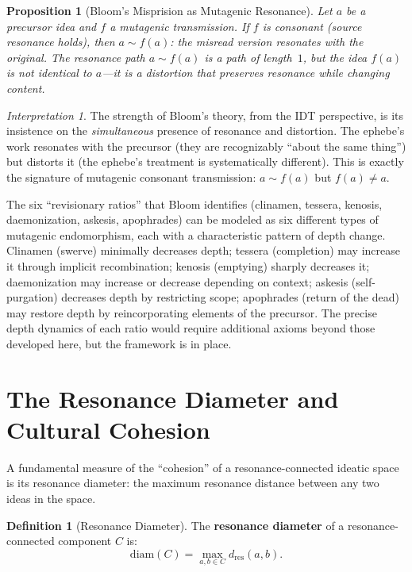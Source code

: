 \documentclass[11pt,openany]{book}
\theoremstyle{definition}
\newtheorem{definition}[axiom]{Definition}
\theoremstyle{plain}
\newtheorem{proposition}[axiom]{Proposition}
\theoremstyle{remark}
\newtheorem{interpretation}[axiom]{Interpretation}
\newcommand{\res}{\sim}                      %
\begin{document}
\begin{proposition}[Bloom's Misprision as Mutagenic Resonance]
Let $a$ be a precursor idea and $f$ a mutagenic transmission. If $f$ is consonant (source resonance holds), then $a \res f(a)$: the misread version resonates with the original. The resonance path $a \res f(a)$ is a path of length~$1$, but the idea $f(a)$ is not identical to $a$---it is a distortion that preserves resonance while changing content.
\end{proposition}

\begin{interpretation}
The strength of Bloom's theory, from the IDT perspective, is its insistence on the \emph{simultaneous} presence of resonance and distortion. The ephebe's work resonates with the precursor (they are recognizably ``about the same thing'') but distorts it (the ephebe's treatment is systematically different). This is exactly the signature of mutagenic consonant transmission: $a \res f(a)$ but $f(a) \neq a$.

The six ``revisionary ratios'' that Bloom identifies (clinamen, tessera, kenosis, daemonization, askesis, apophrades) can be modeled as six different types of mutagenic endomorphism, each with a characteristic pattern of depth change. Clinamen (swerve) minimally decreases depth; tessera (completion) may increase it through implicit recombination; kenosis (emptying) sharply decreases it; daemonization may increase or decrease depending on context; askesis (self-purgation) decreases depth by restricting scope; apophrades (return of the dead) may restore depth by reincorporating elements of the precursor. The precise depth dynamics of each ratio would require additional axioms beyond those developed here, but the framework is in place.
\end{interpretation}

\section{The Resonance Diameter and Cultural Cohesion}

A fundamental measure of the ``cohesion'' of a resonance-connected ideatic space is its resonance diameter: the maximum resonance distance between any two ideas in the space.

\begin{definition}[Resonance Diameter]
The \textbf{resonance diameter} of a resonance-connected component $C$ is:
\[
\mathrm{diam}(C) = \max_{a, b \in C} d_{\mathrm{res}}(a, b).
\]
\end{definition}
\end{document}

